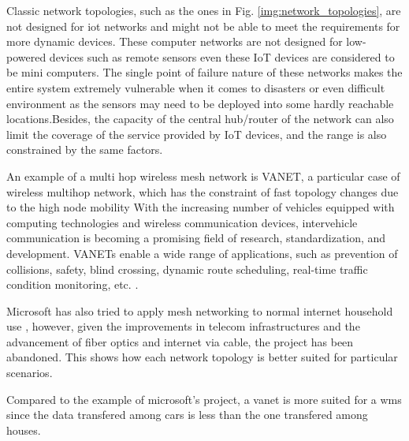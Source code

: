 		
		Classic network topologies, such as the ones in Fig. \ref{img:network_topologies}, are not designed for iot networks and might not be able to meet the requirements for more dynamic devices.		
		These computer networks are not designed for low-powered devices such as remote sensors even these IoT devices are considered to be mini computers.
		The single point of failure nature of these networks makes the entire system extremely vulnerable when it comes to disasters or even difficult environment as the sensors may need to be deployed into some hardly reachable locations.Besides, the capacity of the central hub/router of the network can also limit the coverage of the service provided by IoT devices, and the range is also constrained by the same factors.
		
		An example of a multi hop wireless mesh network is VANET, a particular case of wireless multihop network, which has the constraint of fast topology changes due to the high node mobility With the increasing number of vehicles equipped with computing technologies and wireless communication devices, intervehicle communication is becoming a promising field of research, standardization, and development. VANETs enable a wide range of applications, such as prevention of collisions, safety, blind crossing, dynamic route scheduling, real-time traffic condition monitoring, etc. \cite{BADIS2015653}.
		
		Microsoft has also tried to apply mesh networking to normal internet household use \cite{bahl2009opportunistic}, however, given the improvements in telecom infrastructures and the advancement of fiber optics and internet via cable, the project has been abandoned.
		This shows how each network topology is better suited for particular scenarios.
		
		Compared to the example of microsoft's project, a vanet is more suited for a wms since the data transfered among cars is less than the one transfered among houses.
		
